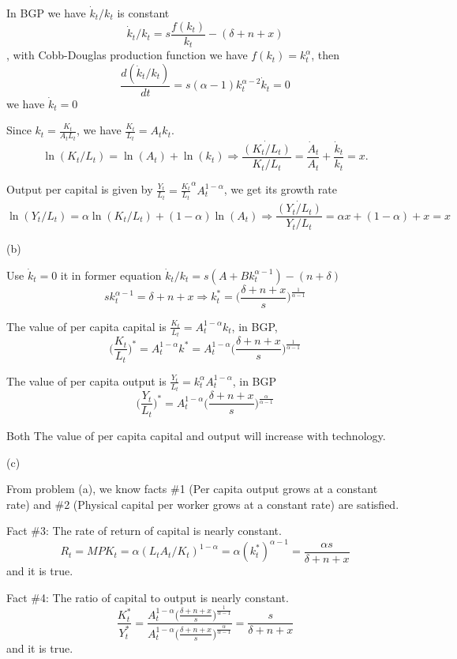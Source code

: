 \documentclass[letterpaper, 11pt]{article}
\newcommand{\1}{\mathds{1}}	%
\theoremstyle{definition}
\begin{document}
In BGP we have $\dot{k}_t/k_t$ is constant \[
  \dot{k}_t/k_t = s \frac{f(k_t)}{k_t} - (\delta + n + x)
\] , with Cobb-Douglas production function we have $f(k_t) = k_t^{\alpha}$, then \[
  \frac{d(\dot{k}_t/k_t)}{dt} = s (\alpha-1) k_t^{\alpha-2} \dot{k}_t = 0
\] we have $\dot{k}_t = 0$

Since $k_t = \frac{K_t}{A_tL_t}$, we have $\frac{K_t}{L_t} = A_tk_t$. \[
  \ln(K_t/L_t) = \ln(A_t) + \ln(k_t) \Longrightarrow \frac{\dot{(K_t/L_t)}}{K_t/L_t} = \frac{\dot{A}_t}{A_t} + \frac{\dot{k}_t}{k_t} = x.
\]

Output per capital is given by $\frac{Y_t}{L_t} = {\frac{K_t}{L_t}}^\alpha A_t^{1-\alpha}$, we get its growth rate \[
  \ln (Y_t/L_t) = \alpha\ln(K_t/L_t) + (1-\alpha) \ln(A_t) \Longrightarrow \frac{\dot{(Y_t/L_t)}}{Y_t/L_t} = \alpha x + (1-\alpha) + x = x
\]

(b)

Use $\dot{k}_t =0$ it in former equation $\dot{k}_t/k_t = s(A + Bk_t^{\alpha-1}) - (n+\delta)$ \[
  s k_t^{\alpha-1} = \delta + n + x \Longrightarrow k_t^{*} = \Big(\frac{\delta + n + x}{s}\Big)^{\frac{1}{\alpha-1}}
\]

The value of per capita capital is $\frac{K_t}{L_t} = A_t^{1-\alpha}k_t$, in BGP, \[
  \Big(\frac{K_t}{L_t}\Big)^{*} = A_t^{1-\alpha} k^* = A_t^{1-\alpha} \Big(\frac{\delta + n + x}{s}\Big)^{\frac{1}{\alpha-1}}
\]

The value of per capita output is $\frac{Y_t}{L_t} = k_t^{\alpha}A_t^{1-\alpha}$, in BGP \[
  \Big(\frac{Y_t}{L_t}\Big)^{*} = A_t^{1-\alpha}\Big(\frac{\delta + n + x}{s}\Big)^{\frac{\alpha}{\alpha-1}}
\]

Both The value of per capita capital and output will increase with technology.

(c)

From problem (a), we know facts \#1 (Per capita output grows at a constant rate) and \#2 (Physical capital per worker grows at a constant rate) are satisfied.

Fact \#3: The rate of return of capital is nearly constant. \[
  R_t = MPK_t = \alpha (L_tA_t/K_t)^{1-\alpha} = \alpha (k^*_t)^{\alpha-1} = \frac{\alpha s}{\delta+n+x}
\]
and it is true.

Fact \#4: The ratio of capital to output is nearly constant.
\[
  \frac{K_t^*}{Y_t^*} = \frac{A_t^{1-\alpha} \Big(\frac{\delta + n + x}{s}\Big)^{\frac{1}{\alpha-1}}}{A_t^{1-\alpha}\Big(\frac{\delta + n + x}{s}\Big)^{\frac{\alpha}{\alpha-1}}} = \frac{s}{\delta + n + x}
\]
and it is true.
\end{document}
